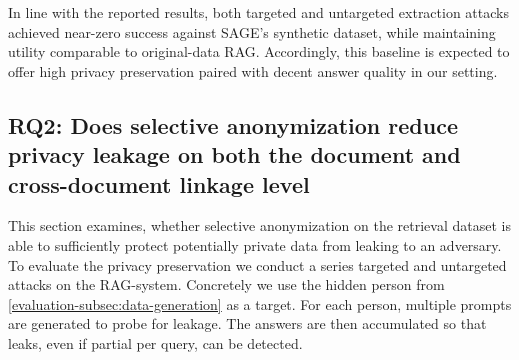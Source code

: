 In line with the reported results, both targeted and untargeted extraction attacks achieved near-zero success against SAGE's synthetic dataset, while maintaining utility comparable to original-data {RAG}. Accordingly, this baseline is expected to offer high privacy preservation paired with decent answer quality in our setting.







\subsection{RQ2: Does selective anonymization reduce privacy leakage on both the document and cross-document linkage level}
This section examines, whether selective anonymization on the retrieval dataset is able to sufficiently protect potentially private data from leaking to an adversary. To evaluate the privacy preservation we conduct a series targeted and untargeted attacks on the {RAG}-system. Concretely we use the hidden person from \ref{evaluation-subsec:data-generation} as a target. For each person, multiple prompts are generated to probe for leakage. The answers are then accumulated so that leaks, even if partial per query, can be detected.


